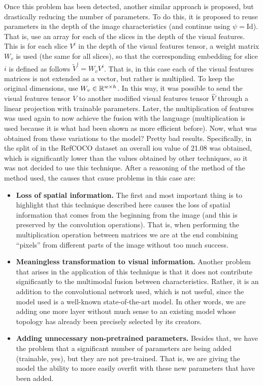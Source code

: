 Once this problem has been detected, another similar approach is proposed, but
drastically reducing the number of parameters. To do this, it is proposed to
reuse parameters in the depth of the image characteristics (and continue using
\(\psi = \text{Id}\)). That is, use an array for each of the slices in the
depth of the visual features. This is for each slice \(V^i\) in the depth of
the visual features tensor, a weight matrix \(W_v\) is used (the same for all
slices), so that the corresponding embedding for slice \(i\) is defined as
follows \(\tilde{V}^i = W_v V^i\). That is, in this case each of the visual
features matrices is not extended as a vector, but rather is multiplied. To
keep the original dimensions, use \(W_v \in \mathbb{R}^{w \times h}\). In this way, it
was possible to send the visual features tensor \(V\) to another modified
visual features tensor \(\hat{V}\) through a linear projection with trainable
parameters. Later, the multiplication of features was used again to now achieve
the fusion with the language (multiplication is used because it is what had
been shown as more efficient before). Now, what was obtained from these
variations to the model? Pretty bad results. Specifically, in the split of
 in the RefCOCO dataset an overall \gls{iou} value of 21.08 was
obtained, which is significantly lower than the values obtained by other
techniques, so it was not decided to use this technique. After a reasoning of
the method of the method used, the causes that cause problems in this case are:
\begin{itemize}
  \item \textbf{Loss of spatial information.} The first and most important
  thing is to highlight that this technique described here causes the loss of
  spatial information that comes from the beginning from the image (and this is
  preserved by the convolution operations). That is, when performing the
  multiplication operation between matrices we are at the end combining
  ``pixels'' from different parts of the image without too much success.
  \item \textbf{Meaningless transformation to visual information.} Another
  problem that arises in the application of this technique is that it does not
  contribute significantly to the multimodal fusion between
  characteristics. Rather, it is an addition to the convolutional network used,
  which is not useful, since the model used is a well-known state-of-the-art
  model. In other words, we are adding one more layer without much sense to an
  existing model whose topology has already been precisely selected by its
  creators.
  \item \textbf{Adding unnecessary non-pretrained parameters.} Besides that, we
  have the problem that a significant number of parameters are being added
  (trainable, yes), but they are not pre-trained. That is, we are giving the
  model the ability to more easily overfit with these new parameters that have
  been added.
\end{itemize}

